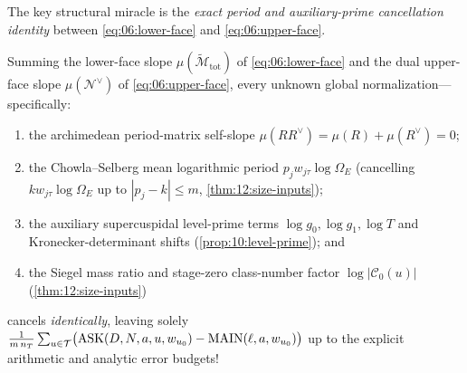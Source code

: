 The key structural miracle is the \emph{exact period and auxiliary-prime cancellation identity} between \eqref{eq:06:lower-face} and \eqref{eq:06:upper-face}.

\begin{lemma}
\label{lem:06:exact-cancel}
Summing the lower-face slope $\mu(\widetilde{\mathcal{M}}_{\mathrm{tot}})$ of \eqref{eq:06:lower-face} and the dual upper-face slope $\mu(\mathcal{N}^\vee)$ of \eqref{eq:06:upper-face}, every unknown global normalization—specifically:
\begin{enumerate}[label=\textup{(\alph*)}]
\item the archimedean period-matrix self-slope $\mu(R R^\vee) = \mu(R) + \mu(R^\vee) = 0$;
\item the Chowla--Selberg mean logarithmic period $p_j w_{j\tau}\log\Omega_E$ (cancelling $k w_{j\tau}\log\Omega_E$ up to $|p_j - k| \le m$, \cref{thm:12:size-inputs});
\item the auxiliary supercuspidal level-prime terms $\log g_0, \log g_1, \log T$ and Kronecker-determinant shifts (\cref{prop:10:level-prime}); and
\item the Siegel mass ratio and stage-zero class-number factor $\log|\mathcal{C}_0(u)|$ (\cref{thm:12:size-inputs})
\end{enumerate}
cancels \emph{identically}, leaving solely $\frac{1}{m\,n_T}\sum_{u \in \mathcal{T}}\bigl(\mathrm{ASK}(D, N, a, u, w_{u_0}) - \mathrm{MAIN}(\ell, a, w_{u_0})\bigr)$ up to the explicit arithmetic and analytic error budgets!
\end{lemma}

